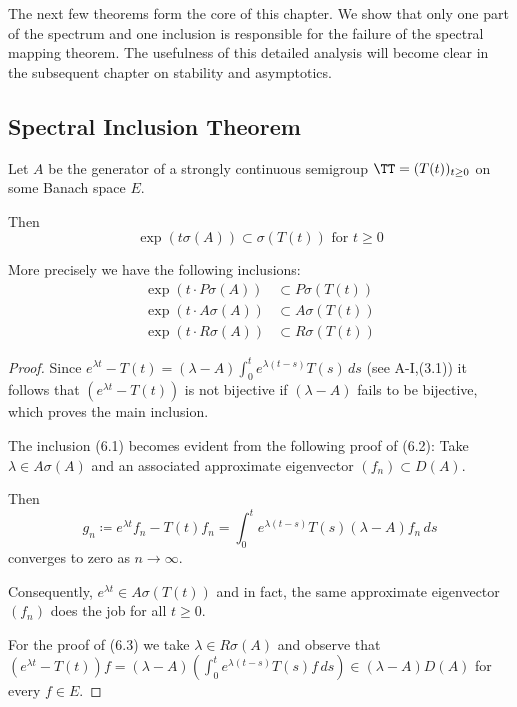 The next few theorems form the core of this chapter. We show that only one part of the spectrum and one inclusion is responsible for the failure of the spectral mapping theorem.
The usefulness of this detailed analysis will become clear in the subsequent chapter on stability and asymptotics.

\subsection{Spectral Inclusion Theorem}\label{subsec:a3-6.2}

Let $A$ be the generator of a strongly continuous semigroup $\TT = (T(t))_{t \geq 0}$ on some Banach space $E$.

Then
\[
\exp(t\sigma(A)) \subset \sigma(T(t)) \text{ for } t \geq 0
\]

More precisely we have the following inclusions:
\begin{align}
	\exp(t \cdot P\sigma(A)) &\subset P\sigma(T(t)) \label{eq:a3-6.1} \\
	\exp(t \cdot A\sigma(A)) &\subset A\sigma(T(t)) \label{eq:a3-6.2} \\
	\exp(t \cdot R\sigma(A)) &\subset R\sigma(T(t)) \label{eq:a3-6.3}
\end{align}

\begin{proof}
	Since $e^{\lambda t} - T(t) = (\lambda - A)\int_{0}^{t} e^{\lambda(t-s)}T(s) \, ds$ (see A-I,(3.1)) it follows that $(e^{\lambda t} - T(t))$ is not bijective if $(\lambda - A)$ fails to be bijective, which proves the main inclusion.
	
	The inclusion (6.1) becomes evident from the following proof of (6.2): Take $\lambda \in A\sigma(A)$ and an associated approximate eigenvector $(f_{n}) \subset D(A)$.
	
	Then
	\[
	g_{n} \coloneqq e^{\lambda t}f_{n} - T(t)f_{n} = \int_{0}^{t} e^{\lambda(t-s)}T(s)(\lambda-A)f_{n} \, ds
	\]
	converges to zero as $n \to \infty$.
	
	Consequently, $e^{\lambda t} \in A\sigma(T(t))$ and in fact, the same approximate eigenvector $(f_{n})$ does the job for all $t \geq 0$.
	
	For the proof of (6.3) we take $\lambda \in R\sigma(A)$ and observe that $(e^{\lambda t} - T(t))f = (\lambda - A)(\int_{0}^{t} e^{\lambda(t-s)}T(s)f \, ds) \in (\lambda - A)D(A)$ for every $f \in E$.
\end{proof}

